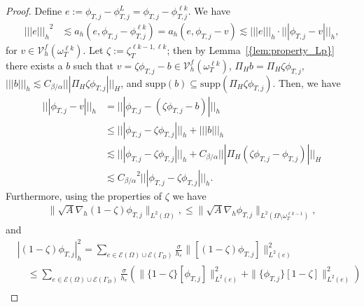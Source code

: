 \documentclass[10pt]{article}
\numberwithin{equation}{section}
\theoremstyle{plain}
\theoremstyle{definition}
\theoremstyle{remark}
\begin{document}
\begin{proof}
  Define $e:=\phi_{T,j}-\phi^L_{T,j}=\phi_{T,j}-\phi^{\ell k}_{T,j}$. We have
  \begin{equation}\label{eq:decay1}
    \begin{aligned}
      {||| {e} |||_h}^2 &\lesssim {a_h({e},{\phi_{T,j}-\phi^{\ell k}_{T,j}})} = {a_h({e},{\phi_{T,j}-v})} \lesssim {||| {e} |||_h}\cdot{||| {\phi_{T,j}-v} |||_h},
    \end{aligned}
  \end{equation}
  for $v\in{\mathcal{V}^f_h({\omega^{\ell k}_T})}$.
  Let $\zeta:=\zeta_{T}^{\ell k-1,\ell k}$; then by {Lemma~\ref{{lem:property_Lp}}} there exists a $b$ such that $v=\zeta\phi_{T,j} - b\in{\mathcal{V}^f_h({\omega^{\ell k}_T})}$,  ${\Pi_H} b = {\Pi_H}\zeta\phi_{T,j}$, ${||| {b} |||_h}\lesssim{C_{{\beta}/{\alpha}}}{||| {{\Pi_H}\zeta\phi_{T,j}} |||_H}$, and $\text{supp}(b)\subseteq\text{supp}({\Pi_H}\zeta\phi_{T,j})$. Then, we have 
  \begin{equation}\label{eq:decay2}
    \begin{aligned}
      {||| {\phi_{T,j}-v} |||_h} &= {||| {\phi_{T,j} - (\zeta\phi_{T,j} - b)} |||_h} \\ 
      &\leq{||| {\phi_{T,j} - \zeta\phi_{T,j}} |||_h} + {||| {b} |||_h} \\
      &\lesssim {||| {\phi_{T,j} - \zeta\phi_{T,j}} |||_h} + {C_{{\beta}/{\alpha}}}{||| {{\Pi_H} (\zeta\phi_{T,j}-\phi_{T,j})} |||_H}\\
      &\lesssim {C_{{\beta}/{\alpha}}}^2{||| {\phi_{T,j} - \zeta\phi_{T,j}} |||_h}.
    \end{aligned}
  \end{equation}
 Furthermore, using the properties of $\zeta$ we have
  \begin{align}\label{eq:decay3}
    \|\sqrt{A}\nabla_h(1-\zeta)\phi_{T,j}\|_{L^2(\Omega)}, 
\leq \|\sqrt{A} \nabla_h\phi_{T,j} \|_{L^2(\Omega\setminus\omega^{\ell k-1}_T)},
  \end{align}
  and
  \begin{equation}\label{eq:decay4}
    \begin{aligned}
      & |(1-\zeta)\phi_{T,j} |^2_{h} = \sum_{e\in{\mathcal{E}}(\Omega)\cup{\mathcal{E}}(\Gamma_D)} \frac{\sigma}{h_e}\|[(1-\zeta)\phi_{T,j}]\|^2_{L^2(e)}  \\
      &\quad\leq \sum_{e\in{\mathcal{E}}(\Omega)\cup{\mathcal{E}}(\Gamma_D)}\frac{\sigma}{h_e}\left(\|\{1-\zeta\}[\phi_{T,j}]\|^2_{L^2(e)} + \|\{\phi_{T,j}\}[1-\zeta]\|^2_{L^2(e)} \right)\\

\end{aligned}
\end{equation}
\end{proof}
\end{document}
